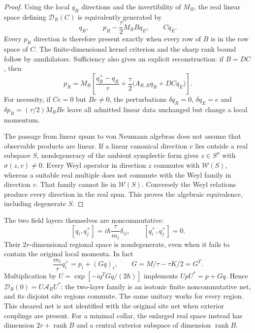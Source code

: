 \begin{proof}
Using the local $q_R$ directions and the invertibility of $M_R$,
the real linear space defining $\mathcal D_R(C)$ is equivalently generated by
\[
 q_R,\qquad p_R-\frac{\tau}{2}M_RBq_E,\qquad Cq_E.
\]
Every $p_R$ direction is therefore present exactly when every row of $B$
is in the row space of $C$. The finite-dimensional kernel criterion and
the sharp rank bound follow by annihilators. Sufficiency also gives an
explicit reconstruction: if $B=DC$, then
\[
 p_R=M_R\left[
   \frac{q_R^+-q_R}{\tau}
   +\frac{\tau}{2}\bigl(A_{R,R}q_R+DCq_E\bigr)\right].
\]
For necessity, if $Ce=0$ but $Be\ne0$, the perturbations
$\delta q_R=0$, $\delta q_E=e$ and
$\delta p_R=(\tau/2)M_RBe$ leave all admitted linear data unchanged
but change a local momentum.

The passage from linear spans to von Neumann algebras does not assume
that observable products are linear. If a linear canonical direction $v$
lies outside a real subspace $S$, nondegeneracy of the ambient symplectic
form gives $z\in S^\sigma$ with $\sigma(z,v)\ne0$. Every Weyl operator
in direction $z$ commutes with $\mathcal W(S)$, whereas a suitable real
multiple does not commute with the Weyl family in direction $v$.
That family cannot lie in $\mathcal W(S)$. Conversely the Weyl relations
produce every direction in the real span. This proves the algebraic
equivalence, including degenerate $S$.
\end{proof}

The two field layers themselves are noncommutative:
\[
 [q_i,q_j^+]=i\hbar\frac{\tau}{m_i}\delta_{ij},
 \qquad [q_i^+,q_j^+]=0.
\]
Their $2r$-dimensional regional space is nondegenerate, even when it fails
to contain the original local momenta. In fact
\[
 \frac{m_i}{\tau}q_i^+=p_i+(Gq)_i,
 \qquad G=M/\tau-\tau K/2=G^T.
\]
Multiplication by
$U=\exp[-iq^TGq/(2\hbar)]$ implements
$UpU^*=p+Gq$. Hence
$\mathcal D_R(0)=U\mathcal A_RU^*$: the two-layer family is an isotonic
finite noncommutative net, and its disjoint site regions commute. The same
unitary works for every region. This sheared net is not identified with
the original site net when exterior couplings are present. For a minimal
collar, the enlarged real space instead has dimension
$2r+\operatorname{rank}B$ and a central exterior subspace of dimension
$\operatorname{rank}B$.

